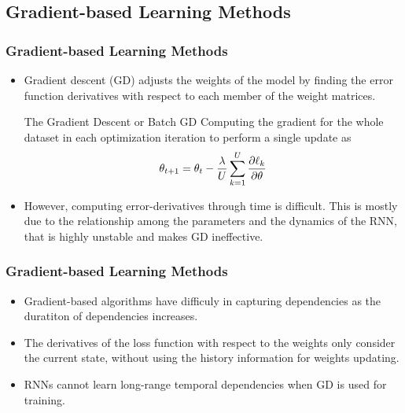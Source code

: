 \documentclass[
	11pt,
]{beamer}
\begin{document}

\subsection{Gradient-based Learning Methods}

\begin{frame}
	\frametitle{Gradient-based Learning Methods}
	\begin{itemize}
		\item Gradient descent (GD) adjusts the
weights of the model by finding the error function derivatives with respect to each member of the weight matrices.
	
 	\bigskip %
  
        \begin{block}{The Gradient Descent or Batch GD}
		Computing the gradient for the whole dataset in each optimization iteration to perform a single update as
		\begin{equation*}
            \theta_{t+1} = \theta_t - \frac{\lambda}{U}\sum_{k=1}^U \pdv{\ell_k}{\theta}
		\end{equation*}
	\end{block}
	
 	\bigskip %

	 \item However, computing error-derivatives through time is difficult. This is mostly due to the
	 relationship among the parameters and the dynamics of the RNN, that is highly unstable and makes GD ineffective.
	\end{itemize}
\end{frame}


\begin{frame}
	\frametitle{Gradient-based Learning Methods}
	\begin{itemize}
		\item Gradient-based algorithms have difficuly in capturing dependencies as the duratiton of dependencies increases.
		\bigskip
		\item The derivatives of the loss function with respect to the weights only consider the current state, without using the history information for weights updating.
		\bigskip
		\item  RNNs cannot learn long-range temporal dependencies when GD is used for training.
	\end{itemize}
\end{frame}
\end{document}
